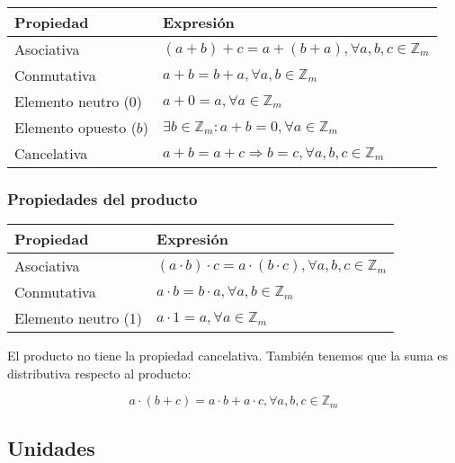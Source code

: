 \begin{center}
\begin{tabular}{l l}
	\textbf{Propiedad}     & \textbf{Expresión}                                                 \\
	\toprule
	Asociativa             & $(a+b) + c = a + (b+a), \forall a,b,c \in\mathbb{Z}_m$             \\
	Conmutativa            & $a+b = b+a, \forall a,b \in\mathbb{Z}_m$                           \\
	Elemento neutro (0)    & $a+0 = a, \forall a \in\mathbb{Z}_m$                               \\
	Elemento opuesto ($b$) & $\exists b \in\mathbb{Z}_m : a + b = 0, \forall a \in\mathbb{Z}_m$ \\
	Cancelativa            & $a+b = a+c \Rightarrow b=c, \forall a,b,c \in\mathbb{Z}_m$         \\
\end{tabular}
\end{center}

\subsubsection{Propiedades del producto}

\begin{center}
\begin{tabular}{l l}
	\textbf{Propiedad}  & \textbf{Expresión}                                                         \\
	\toprule
	Asociativa          & $(a \cdot b) \cdot c = a \cdot (b \cdot c), \forall a,b,c \in\mathbb{Z}_m$ \\
	Conmutativa         & $a \cdot b = b \cdot a, \forall a,b \in\mathbb{Z}_m$                       \\
	Elemento neutro (1) & $a \cdot 1 = a, \forall a \in\mathbb{Z}_m$                                 \\
\end{tabular}
\end{center}

El producto no tiene la propiedad cancelativa.
También tenemos que la suma es distributiva respecto al producto:

\[a \cdot (b+c) = a \cdot b + a \cdot c, \forall a,b,c \in\mathbb{Z}_m\]

\subsection{Unidades}

